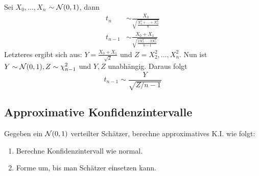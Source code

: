 \begin{example}
	Sei $X_{0}, \ldots, X_{n}$ \iid $\sim \mathcal{N}(0,1)$, dann
	\begin{align*}
		t_n & \sim \frac{X_0}{\sqrt{\frac{X_1^2 + \ldots + X_n^2}{n}}} \\
		t_{n-1} & \sim \frac{X_0 + X_1}{\sqrt{\frac{2X_{2}^2, \ldots, 2X_{n}^2}{n-1} }} 
	\end{align*}
	Letzteres ergibt sich aus: $Y = \frac{X_0 + X_1}{\sqrt{2}}$ und $Z = X_{2}^2, \ldots, X_{n}^2$. Nun ist $Y \sim
	\mathcal{N} (0,1), Z \sim \chi_{n-1}^2$ und $Y,Z$ unabhängig. Daraus folgt
	\begin{equation*}
		t_{n-1} \sim \frac{Y}{\sqrt{Z/n-1}} 
	\end{equation*}

\end{example}

\subsection*{Approximative Konfidenzintervalle}%
\label{sub:approximative_konfidenzintervalle}

Gegeben ein $\mathcal{N} (0,1)$ verteilter Schätzer, berechne approximatives K.I. wie folgt:
\begin{enumerate}
	\item Berechne Konfidenzintervall wie normal.
	\item Forme um, bis man Schätzer einsetzen kann.
\end{enumerate}

